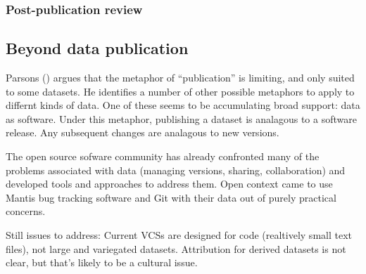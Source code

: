 \documentclass[10pt,a4paper,twocolumn]{article}
\begin{document}
\subsubsection{Post-publication review}\label{post-publication-review}

\subsection*{Beyond data publication}\label{beyond-data-publication}

Parsons () argues that the metaphor of ``publication'' is limiting, and only suited to some datasets. 
He identifies a number of other possible metaphors to apply to differnt kinds of data. One of these seems to be accumulating broad support: data as software. 
Under this metaphor, publishing a dataset is analagous to a software release. 
Any subsequent changes are analagous to new versions.

The open source sofware community has already confronted many of the problems associated with data (managing versions, sharing, collaboration) and developed tools and approaches to address them. 
Open context came to use Mantis bug tracking software and Git with their data out of purely practical concerns.

Still issues to address: Current VCSs are designed for code (realtively small text files), not large and variegated datasets. 
Attribution for derived datasets is not clear, but that's likely to be a cultural issue.


\nocite{*}
{\small
}








\end{document}
